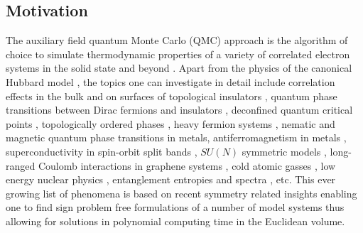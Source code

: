 
\subsection{Motivation}

The auxiliary field quantum Monte Carlo (QMC) approach is the algorithm of choice to simulate  thermodynamic properties of a variety of correlated electron systems in the solid state and beyond \cite{Blankenbecler81,White89,Sugiyama86,Sorella89, Duane87, Assaad08_rev}.  
Apart from the physics of the  canonical Hubbard model 
\cite{Scalapino07,LeBlanc15},   the topics one can investigate in detail include correlation effects in the bulk and on surfaces of topological insulators \cite{Hohenadler10,Zheng11}, quantum phase transitions between  Dirac fermions  and insulators \cite{Assaad13,Toldin14,Otsuka16,Chandrasekharan},  
deconfined quantum critical points \cite{Li15a,Assaad16}, topologically ordered phases \cite{Assaad16}, heavy fermion systems \cite{Assaad99a,Capponi00}, nematic \cite{Schattner15} and magnetic  \cite{Xu16b} quantum phase transitions in metals, antiferromagnetism in metals \cite{Berg12},    superconductivity in spin-orbit split bands \cite{Tang14_1}, $SU(N)$ symmetric models \cite{Assaad04,Lang13},  long-ranged Coulomb interactions in graphene systems \cite{Hohenadler14,Tang15},  cold atomic gasses  \cite{Rigol03},  low energy nuclear physics \cite{Lee09},  entanglement entropies and spectra \cite{Grover13,Broecker14,Assaad13a,Assaad15},  etc. 
This ever growing list of phenomena is based on  recent symmetry related insights enabling one to  find  sign problem  free formulations of a number of model systems thus allowing for solutions in polynomial computing time \cite{Wu04,Huffman14,Yao14a,Wei16} in the Euclidean volume.  


